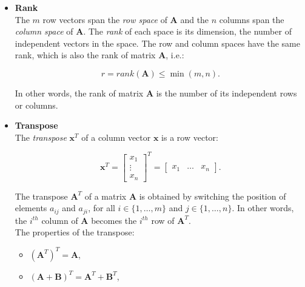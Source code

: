 \documentclass[10pt,b5paper,titlepage]{book}
\begin{document}
\begin{itemize}
    \item \textbf{Rank}\\

        The $m$ row vectors span the \textit{row space} of $\mathbf{A}$ and the
        $n$ columns span the \textit{column space} of $\mathbf{A}$. The \textit{rank}
        of each space is its dimension, the number of independent vectors in the
        space. The row and column spaces have the same rank, which is also the
        rank of matrix $\mathbf{A}$, i.e.:

        \begin{equation}
            r = rank(\mathbf{A}) \le \min(m, n)
        .\end{equation}

        In other words, the rank of matrix $\mathbf{A}$ is the number of its
        independent rows or columns.

     \item \textbf{Transpose}\\

        The \textit{transpose} $\mathbf{x}^{T}$ of a column vector $\mathbf{x}$
        is a row vector:

        \begin{equation}
            \mathbf{x}^{T} = \begin{bmatrix} x_1\\ \vdots\\ x_n \end{bmatrix}^{T}
            = \begin{bmatrix} x_1 & \ldots & x_n \end{bmatrix}
        .\end{equation}

        The transpose $\mathbf{A}^{T}$ of a matrix $\mathbf{A}$ is obtained
        by switching the position of elements $a_{ij}$ and $a_{ji}$,
        for all $i \in \{1, \ldots, m\}$ and $j \in \{1, \ldots, n\}$.
        In other words, the $i^{th}$ column of $\mathbf{A}$ becomes the
        $i^{th}$ row of $\mathbf{A}^{T}$.\\

        The properties of the transpose:

        \begin{itemize}
            \item $(\mathbf{A}^{T})^{T} = \mathbf{A}$,

            \item $(\mathbf{A} + \mathbf{B})^{T} = \mathbf{A}^{T} + \mathbf{B}^{T}$,


\end{itemize}
\end{itemize}
\end{document}
